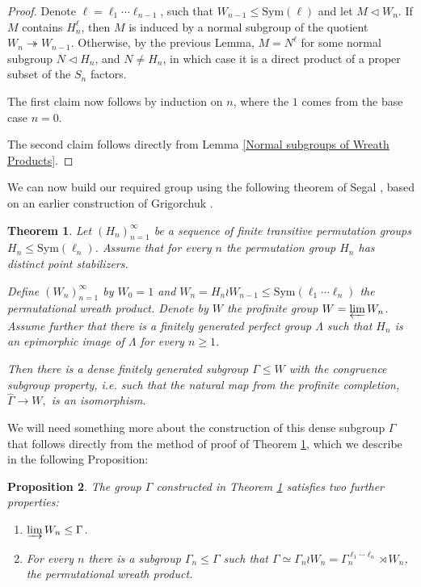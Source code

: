 \documentclass[letterpaper]{amsart}
\newtheorem{theorem}{Theorem}[section]
\newtheorem{proposition}[theorem]{Proposition}
\begin{document}
\begin{proof}
    Denote $\ell = \ell_1 \cdots \ell_{n - 1}$, such that $W_{n - 1} \leq \mathrm{Sym}(\ell)$ and let $M \lhd W_n$.
    If $M$ contains $H_n^\ell$, then $M$ is induced by a normal subgroup of the quotient $W_n \twoheadrightarrow W_{n-1}$.
    Otherwise, by the previous Lemma, $M = N^\ell$ for some normal subgroup $N \lhd H_n$, and $N \neq H_n$, in which case it is a direct product of a proper subset of the $S_n$ factors.

    The first claim now follows by induction on $n$, where the $1$ comes from the base case $n = 0$.

    The second claim follows directly from Lemma \ref{Normal subgroups of Wreath Products}.
\end{proof}

We can now build our required group using the following theorem of Segal \cite[Theorem 5]{segal2000finite}, based on an earlier construction of Grigorchuk \cite{grigorchuk2000just}.
\begin{theorem}
\label{Segal dense subgroup}
    Let $(H_n)_{n=1}^\infty$ be a sequence of finite transitive permutation groups $H_n \leq \mathrm{Sym}(\ell_n)$.
    Assume that for every $n$ the permutation group $H_n$ has distinct point stabilizers.
    
    Define $(W_n)_{n=1}^\infty$ by $W_0 = 1$ and $W_n = H_n \wr W_{n - 1} \leq \mathrm{Sym}(\ell_1 \cdots \ell_n)$ the permutational wreath product. Denote by $W$ the profinite group $W = \varprojlim W_n$.
    Assume further that there is a finitely generated perfect group $\Lambda$ such that $H_n$ is an epimorphic image of $\Lambda$ for every $n \geq 1$.
    
    Then there is a dense finitely generated subgroup $\Gamma \leq W$ with the congruence subgroup property, i.e. such that the natural map from the profinite completion, $\hat{\Gamma} \to W,$ is an isomorphism.
\end{theorem}
We will need something more about the construction of this dense subgroup $\Gamma$ that follows directly from the method of proof of Theorem \ref{Segal dense subgroup}, which we describe in the following Proposition:
\begin{proposition}
\label{Inductive construction segal}
    The group $\Gamma$ constructed in Theorem \ref{Segal dense subgroup} satisfies two further properties:
    \begin{enumerate}
        \item $\varinjlim W_n \leq \Gamma$.
        \item For every $n$ there is a subgroup $\Gamma_n \leq \Gamma$ such that $\Gamma \simeq \Gamma_n \wr W_n = \Gamma_n^{\ell_1 \cdots \ell_n} \rtimes W_n$, the permutational wreath product.
    \end{enumerate}
\end{proposition}
\end{document}
